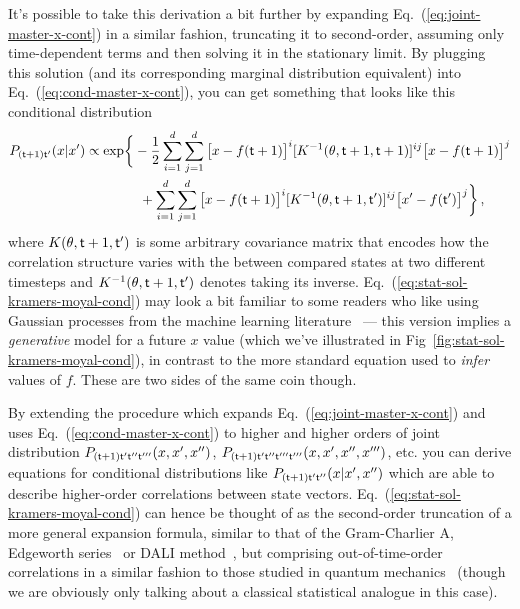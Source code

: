 It's possible to take this derivation a bit further by expanding Eq.~(\ref{eq:joint-master-x-cont}) in a similar fashion, truncating it to second-order, assuming only time-dependent terms and then solving it in the stationary limit. By plugging this solution (and its corresponding marginal distribution equivalent) into Eq.~(\ref{eq:cond-master-x-cont}), you can get something that looks like this conditional distribution
\begin{align}
P_{({\sf t}+1){\sf t}'}(x\vert x') &\propto {\rm exp}\bigg\{ -\frac{1}{2}\sum^d_{i=1}\sum^d_{j=1}\big[ x-f({\sf t}+1)\big]^i [K^{-1}(\theta , {\sf t}+1,{\sf t}+1)]^{ij}\big[ x-f({\sf t}+1)\big]^j \nonumber \\
& \qquad \qquad + \sum^d_{i=1}\sum^d_{j=1}\big[ x-f({\sf t}+1)\big]^i [K^{-1}(\theta , {\sf t}+1,{\sf t}')]^{ij}\big[ x'-f({\sf t}')\big]^j  \bigg\} \label{eq:stat-sol-kramers-moyal-cond}\,,
\end{align}
where $K(\theta , {\sf t}+1,{\sf t}')$ is some arbitrary covariance matrix that encodes how the correlation structure varies with the between compared states at two different timesteps and $K^{-1}(\theta , {\sf t}+1,{\sf t}')$ denotes taking its inverse. Eq.~(\ref{eq:stat-sol-kramers-moyal-cond}) may look a bit familiar to some readers who like using Gaussian processes from the machine learning literature~\cite{murphy2012machine} --- this version implies a \emph{generative} model for a future $x$ value (which we've illustrated in Fig~\ref{fig:stat-sol-kramers-moyal-cond}), in contrast to the more standard equation used to \emph{infer} values of $f$. These are two sides of the same coin though.

By extending the procedure which expands Eq.~(\ref{eq:joint-master-x-cont}) and uses Eq.~(\ref{eq:cond-master-x-cont}) to higher and higher orders of joint distribution $P_{({\sf t}+1){\sf t}'{\sf t}''{\sf t'''}}(x, x', x'')$, $P_{({\sf t}+1){\sf t}'{\sf t}''{\sf t}'''{\sf t'''}}(x, x', x'', x''')$, etc. you can derive equations for conditional distributions like $P_{({\sf t}+1){\sf t}'{\sf t}''}(x\vert x', x'')$ which are able to describe higher-order correlations between state vectors. Eq.~(\ref{eq:stat-sol-kramers-moyal-cond}) can hence be thought of as the second-order truncation of a more general expansion formula, similar to that of the Gram-Charlier A, Edgeworth series~\cite{kolassa2006series} or DALI method~\cite{sellentin2014breaking, dali}, but comprising out-of-time-order correlations in a similar fashion to those studied in quantum mechanics~\cite{hashimoto2017out,García-Mata:2023} (though we are obviously only talking about a classical statistical analogue in this case).

